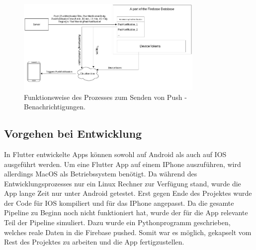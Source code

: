 \begin{figure}[H]
 \centering
 \includegraphics[width=0.8\textwidth,angle=0]{abb/PushNotificationArchitecture}
 \caption[Funktionsweise von Pushbenachrichtigungen]{Funktionsweise des Prozesses zum Senden von Push - Benachrichtigungen.}
\label{fig:funktionsweise_pushnachrichten_senden}
\end{figure}

\subsection{Vorgehen bei Entwicklung}
In Flutter entwickelte Apps können sowohl auf Android als auch auf IOS ausgeführt werden. 
Um eine Flutter App auf einem IPhone auszuführen, wird allerdings MacOS als Betriebssystem benötigt. 
Da während des Entwicklungsprozesses nur ein Linux Rechner zur Verfügung stand, wurde die App lange Zeit nur unter
Android getestet. 
Erst gegen Ende des Projektes wurde der Code für IOS kompiliert und für das IPhone angepasst.  
Da die gesamte Pipeline zu Beginn noch nicht funktioniert hat, wurde der für die App relevante Teil der Pipeline simuliert.
Dazu wurde ein Pythonprogramm geschrieben, welches reale Daten in die Firebase pushed. 
Somit war es möglich, gekapselt vom Rest des Projektes zu arbeiten und die App fertigzustellen.


    

